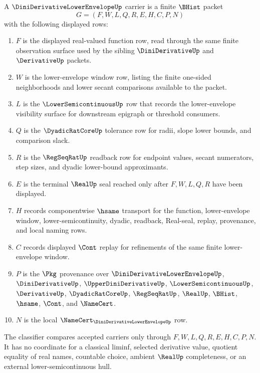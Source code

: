 \begin{definition}
\label{def:dini-derivative-lower-envelope-carrier}
A $\DiniDerivativeLowerEnvelopeUp$ carrier is a finite $\BHist$ packet
$$
G=(F,W,L,Q,R,E,H,C,P,N)
$$
with the following displayed rows:
\begin{enumerate}
\item $F$ is the displayed real-valued function row, read through the same finite observation surface used by the sibling $\DiniDerivativeUp$ and $\DerivativeUp$ packets.
\item $W$ is the lower-envelope window row, listing the finite one-sided neighborhoods and lower secant comparisons available to the packet.
\item $L$ is the $\LowerSemicontinuousUp$ row that records the lower-envelope visibility surface for downstream epigraph or threshold consumers.
\item $Q$ is the $\DyadicRatCoreUp$ tolerance row for radii, slope lower bounds, and comparison slack.
\item $R$ is the $\RegSeqRatUp$ readback row for endpoint values, secant numerators, step sizes, and dyadic lower-bound approximants.
\item $E$ is the terminal $\RealUp$ seal reached only after $F,W,L,Q,R$ have been displayed.
\item $H$ records componentwise $\hsame$ transport for the function, lower-envelope window, lower-semicontinuity, dyadic, readback, Real-seal, replay, provenance, and local naming rows.
\item $C$ records displayed $\Cont$ replay for refinements of the same finite lower-envelope window.
\item $P$ is the $\Pkg$ provenance over $\DiniDerivativeLowerEnvelopeUp$, $\DiniDerivativeUp$, $\UpperDiniDerivativeUp$, $\LowerSemicontinuousUp$, $\DerivativeUp$, $\DyadicRatCoreUp$, $\RegSeqRatUp$, $\RealUp$, $\BHist$, $\hsame$, $\Cont$, and $\NameCert$.
\item $N$ is the local $\NameCert_{\DiniDerivativeLowerEnvelopeUp}$ row.
\end{enumerate}
The classifier compares accepted carriers only through $F,W,L,Q,R,E,H,C,P,N$. It has no coordinate for a classical liminf, selected derivative value, quotient equality of real names, countable choice, ambient $\RealUp$ completeness, or an external lower-semicontinuous hull.
\end{definition}

